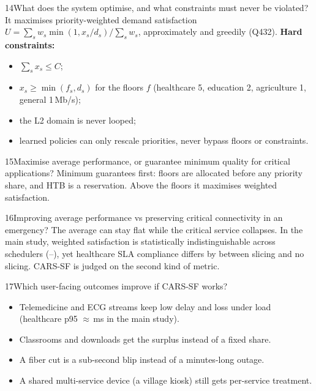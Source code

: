 \begin{qa}{14}{What does the system optimise, and what constraints must never be violated?}
It maximises priority-weighted demand satisfaction
$U=\sum_s w_s\min(1,x_s/d_s)/\sum_s w_s$, approximately and greedily (Q432).
\textbf{Hard constraints:}
\begin{itemize}
\item $\sum_s x_s\le C$;
\item $x_s\ge \min(f_s,d_s)$ for the floors $f$ (healthcare 5, education 2, agriculture 1, general 1\,Mb/s);
\item the L2 domain is never looped;
\item learned policies can only rescale priorities, never bypass floors or constraints.
\end{itemize}
\end{qa}

\begin{qa}{15}{Maximise average performance, or guarantee minimum quality for critical applications?}
Minimum guarantees first: floors are allocated before any priority share, and HTB  is a reservation.
Above the floors it maximises weighted satisfaction.
\end{qa}

\begin{qa}{16}{Improving average performance vs preserving critical connectivity in an emergency?}
The average can stay flat while the critical service collapses. In the main study, weighted satisfaction is
statistically indistinguishable across schedulers (\NUtilMin--\NUtilMax), yet healthcare SLA compliance differs by
\NSlaDeltaNoSlicing{} between slicing and no slicing. CARS-SF is judged on the second kind of metric.
\end{qa}

\begin{qa}{17}{Which user-facing outcomes improve if CARS-SF works?}
\begin{itemize}
\item Telemedicine and ECG streams keep low delay and loss under load (healthcare p95 $\approx$\NHcPninefiveProposed\,ms in the main study).
\item Classrooms and downloads get the surplus instead of a fixed share.
\item A fiber cut is a sub-second blip instead of a minutes-long outage.
\item A shared multi-service device (a village kiosk) still gets per-service treatment.
\end{itemize}
\end{qa}


